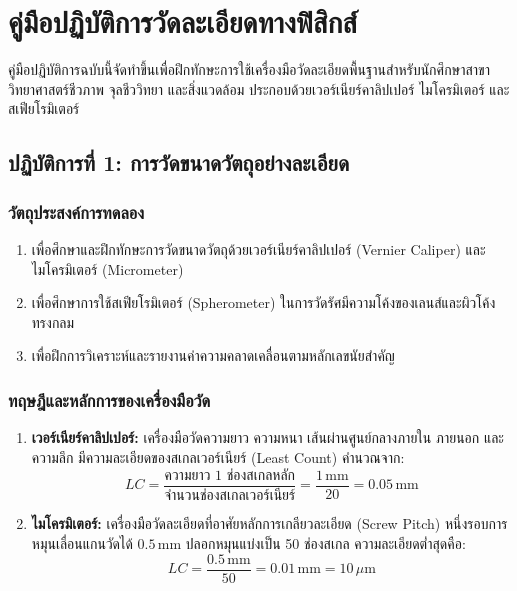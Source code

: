 \chapter{คู่มือปฏิบัติการวัดละเอียดทางฟิสิกส์}
\label{app:lab_manual}

คู่มือปฏิบัติการฉบับนี้จัดทำขึ้นเพื่อฝึกทักษะการใช้เครื่องมือวัดละเอียดพื้นฐานสำหรับนักศึกษาสาขาวิทยาศาสตร์ชีวภาพ จุลชีววิทยา และสิ่งแวดล้อม ประกอบด้วยเวอร์เนียร์คาลิปเปอร์ ไมโครมิเตอร์ และสเฟียโรมิเตอร์

\section{ปฏิบัติการที่ 1: การวัดขนาดวัตถุอย่างละเอียด}

\subsection{วัตถุประสงค์การทดลอง}
\begin{enumerate}
    \item เพื่อศึกษาและฝึกทักษะการวัดขนาดวัตถุด้วยเวอร์เนียร์คาลิปเปอร์ (Vernier Caliper) และไมโครมิเตอร์ (Micrometer)
    \item เพื่อศึกษาการใช้สเฟียโรมิเตอร์ (Spherometer) ในการวัดรัศมีความโค้งของเลนส์และผิวโค้งทรงกลม
    \item เพื่อฝึกการวิเคราะห์และรายงานค่าความคลาดเคลื่อนตามหลักเลขนัยสำคัญ
\end{enumerate}

\subsection{ทฤษฎีและหลักการของเครื่องมือวัด}
\begin{enumerate}
    \item \textbf{เวอร์เนียร์คาลิปเปอร์:} เครื่องมือวัดความยาว ความหนา เส้นผ่านศูนย์กลางภายใน ภายนอก และความลึก มีความละเอียดของสเกลเวอร์เนียร์ (Least Count) คำนวณจาก:
    \begin{equation}
        LC = \frac{\text{ความยาว 1 ช่องสเกลหลัก}}{\text{จำนวนช่องสเกลเวอร์เนียร์}} = \frac{1\,\text{mm}}{20} = 0.05\,\text{mm}
    \end{equation}
    
    \item \textbf{ไมโครมิเตอร์:} เครื่องมือวัดละเอียดที่อาศัยหลักการเกลียวละเอียด (Screw Pitch) หนึ่งรอบการหมุนเลื่อนแกนวัดได้ $0.5\,\text{mm}$ ปลอกหมุนแบ่งเป็น 50 ช่องสเกล ความละเอียดต่ำสุดคือ:
    \begin{equation}
        LC = \frac{0.5\,\text{mm}}{50} = 0.01\,\text{mm} = 10\,\mu\text{m}
    \end{equation}
\end{enumerate}

